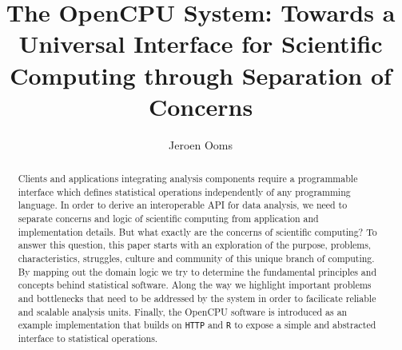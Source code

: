 \documentclass{article}
\author{Jeroen Ooms}
\title{The OpenCPU System: Towards a Universal Interface for Scientific Computing through Separation of Concerns}
\newcommand{\R}{\texttt{R}\xspace}
\newcommand{\HTTP}{\texttt{HTTP}\xspace}
\begin{document}
\maketitle

\begin{abstract}
Clients and applications integrating analysis components require a programmable interface which defines statistical operations independently of any programming language. In order to derive an interoperable API for data analysis, we need to separate concerns and logic of scientific computing from application and implementation details. But what exactly are the concerns of scientific computing? To answer this question, this paper starts with an exploration of the purpose, problems, characteristics, struggles, culture and community of this unique branch of computing. By mapping out the domain logic we try to determine the fundamental principles and concepts behind statistical software. Along the way we highlight important problems and bottlenecks that need to be addressed by the system in order to facilicate reliable and scalable analysis units. Finally, the OpenCPU software is introduced as an example implementation that builds on \HTTP and \R to expose a simple and abstracted interface to statistical operations.
\end{abstract}







 







\end{document}

